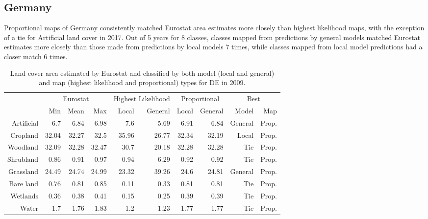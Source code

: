 \subsection{Germany}
Proportional maps of Germany consistently matched Eurostat area estimates more closely than highest likelihood maps, with the exception of a tie for Artificial land cover in 2017. Out of 5 years for 8 classes, classes mapped from predictions by general models matched Eurostat estimates more closely than those made from predictions by local models 7 times, while classes mapped from local model predictions had a closer match 6 times.
\begin{table}[H]
\centering
\caption{Land cover area estimated by Eurostat and classified by both model (local and general) and map (highest likelihood and proportional) types for DE in 2009.}

\begin{tabular}{r|rrr|rr|rr|rr}
\toprule
{} & \multicolumn{3}{|c}{Eurostat} & \multicolumn{2}{|c}{Highest Likelihood} & \multicolumn{2}{|c}{Proportional} & \multicolumn{2}{|c}{Best} \\
{} &      Min &   Mean &    Max &              Local & General &        Local & General &    Model &    Map \\
\midrule
Artificial &      6.7 &   6.84 &   6.98 &                7.6 &    5.69 &         6.91 &    6.84 &  General &  Prop. \\
Cropland   &    32.04 &  32.27 &   32.5 &              35.96 &   26.77 &        32.34 &   32.19 &    Local &  Prop. \\
Woodland   &    32.09 &  32.28 &  32.47 &               30.7 &   20.18 &        32.28 &   32.28 &      Tie &  Prop. \\
Shrubland  &     0.86 &   0.91 &   0.97 &               0.94 &    6.29 &         0.92 &    0.92 &      Tie &  Prop. \\
Grassland  &    24.49 &  24.74 &  24.99 &              23.32 &   39.26 &         24.6 &   24.81 &  General &  Prop. \\
Bare land  &     0.76 &   0.81 &   0.85 &               0.11 &    0.33 &         0.81 &    0.81 &      Tie &  Prop. \\
Wetlands   &     0.36 &   0.38 &   0.41 &               0.15 &    0.25 &         0.39 &    0.39 &      Tie &  Prop. \\
Water      &      1.7 &   1.76 &   1.83 &                1.2 &    1.23 &         1.77 &    1.77 &      Tie &  Prop. \\
\bottomrule
\end{tabular}
\end{table}

